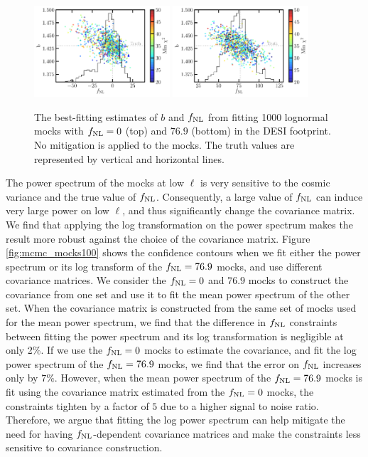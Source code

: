 \begin{figure}
    \centering
    \includegraphics[width=0.45\textwidth]{figures/bestfit_zero.pdf} 
    \includegraphics[width=0.45\textwidth]{figures/bestfit_po100.pdf}         
    \caption{The best-fitting estimates of $b$ and $f_{\rm NL}$ from fitting 1000 lognormal mocks with $f_{\rm NL}=0$ (top) and $76.9$ (bottom) in the DESI footprint. No mitigation is applied to the mocks. The truth values are represented by vertical and horizontal lines.}\label{fig:bestfit_mocks}
\end{figure}

The power spectrum of the mocks at low $\ell$ is very sensitive to the cosmic variance and the true value of $f_{\rm NL}$. Consequently, a large value of $f_{\rm NL}$ can induce very large power on low $\ell$, and thus significantly change the covariance matrix. We find that applying the log transformation on the power spectrum makes the result more robust against the choice of the covariance matrix. Figure \ref{fig:mcmc_mocks100} shows the confidence contours when we fit either the power spectrum or its log transform of the $f_{\rm NL}=76.9$ mocks, and use different covariance matrices. We consider the $f_{\rm NL}=0$ and $76.9$ mocks to construct the covariance from one set and use it to fit the mean power spectrum of the other set. When the covariance matrix is constructed from the same set of mocks used for the mean power spectrum, we find that the difference in $f_{\rm NL}$ constraints between fitting the power spectrum and its log transformation is negligible at only 2\%. If we use the $f_{\rm NL}=0$ mocks to estimate the covariance, and fit the log power spectrum of the $f_{\rm NL}=76.9$ mocks, we find that the error on $f_{\rm NL}$ increases only by $7\%$. However, when the mean power spectrum of the $f_{\rm NL}=76.9$ mocks is fit using the covariance matrix estimated from the $f_{\rm NL}=0$ mocks, the constraints tighten by a factor of $5$ due to a higher signal to noise ratio. Therefore, we argue that fitting the log power spectrum can help mitigate the need for having $f_{\rm NL}$-dependent covariance matrices and make the constraints less sensitive to covariance construction.


